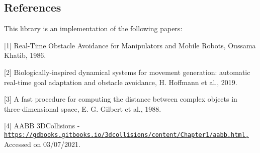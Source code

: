 \subsection*{References}

This library is an implementation of the following papers\+:


\begin{DoxyItemize}
\item \mbox{[}1\mbox{]} Real-\/\+Time Obstacle Avoidance for Manipulators and Mobile Robots, Oussama Khatib, 1986.
\item \mbox{[}2\mbox{]} Biologically-\/inspired dynamical systems for movement generation\+: automatic real-\/time goal adaptation and obstacle avoidance, H. Hoffmann et al., 2019.
\item \mbox{[}3\mbox{]} A fast procedure for computing the distance between complex objects in three-\/dimensional space, E. G. Gilbert et al., 1988.
\item \mbox{[}4\mbox{]} A\+A\+BB 3\+D\+Collisions -\/ \href{https://gdbooks.gitbooks.io/3dcollisions/content/Chapter1/aabb.html,}{\tt https\+://gdbooks.\+gitbooks.\+io/3dcollisions/content/\+Chapter1/aabb.\+html,} Accessed on 03/07/2021. 
\end{DoxyItemize}